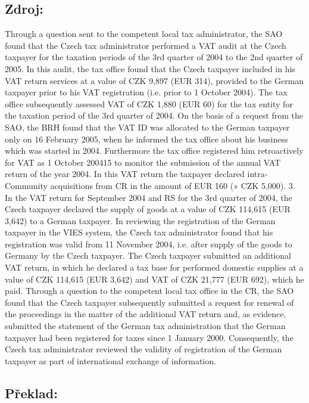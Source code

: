 \documentclass[10pt]{article}
\begin{document}
\subsection*{Zdroj:}

Through a question sent to the competent local tax administrator, the SAO found that the Czech tax administrator performed a VAT audit at the Czech taxpayer for the taxation periods of the 3rd quarter of 2004 to the 2nd quarter of 2005.
In this audit, the tax office found that the Czech taxpayer included in his VAT return services at a value of CZK 9,897 (EUR 314), provided to the German taxpayer prior to his VAT registration (i.e. prior to 1 October 2004).
The tax office subsequently assessed VAT of CZK 1,880 (EUR 60) for the tax entity for the taxation period of the 3rd quarter of 2004.
On the basis of a request from the SAO, the BRH found that the VAT ID was allocated to the German taxpayer only on 16 February 2005, when he informed the tax office about his business which was started in 2004.
Furthermore the tax office registered him retroactively for VAT as 1 October 200415 to monitor the submission of the annual VAT return of the year 2004.
In this VAT return the taxpayer declared intra-Community acquisitions from CR in the amount of EUR 160 (» CZK 5,000).
3. In the VAT return for September 2004 and RS for the 3rd quarter of 2004, the Czech taxpayer declared the supply of goods at a value of CZK 114,615 (EUR 3,642) to a German taxpayer.
In reviewing the registration of the German taxpayer in the VIES system, the Czech tax administrator found that his registration was valid from 11 November 2004, i.e. after supply of the goods to Germany by the Czech taxpayer.
The Czech taxpayer submitted an additional VAT return, in which he declared a tax base for performed domestic supplies at a value of CZK 114,615 (EUR 3,642) and VAT of CZK 21,777 (EUR 692), which he paid.
Through a question to the competent local tax office in the CR, the SAO found that the Czech taxpayer subsequently submitted a request for renewal of the proceedings in the matter of the additional VAT return and, as evidence, submitted the statement of the German tax administration that the German taxpayer had been registered for taxes since 1 January 2000.
Consequently, the Czech tax administrator reviewed the validity of registration of the German taxpayer as part of international exchange of information.


\pagebreak

\subsection*{Překlad:}
\end{document}

